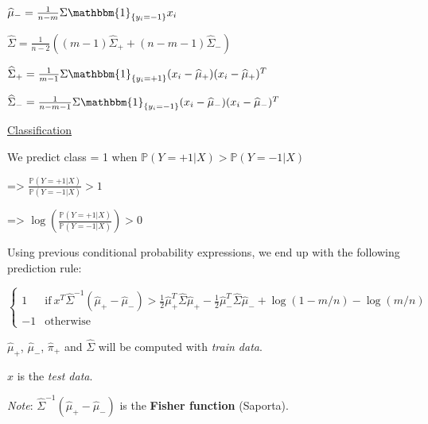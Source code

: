 $\widehat{\mu}_- = \frac{1}{n-m} \Sigma \mathbbm{1}_{\{y_i=-1\}}x_i$

$\widehat{\Sigma} = \frac{1}{n-2} ((m-1) \widehat{\Sigma}_+ + (n-m-1)\widehat{\Sigma}_-)$

$\widehat{\Sigma}_+ = \frac{1}{m-1} \Sigma \mathbbm{1}_{\{y_i=+1\}}(x_i-\widehat{\mu}_+)(x_i-\widehat{\mu}_+)^T$

$\widehat{\Sigma}_- = \frac{1}{n-m-1} \Sigma \mathbbm{1}_{\{y_i=-1\}}(x_i-\widehat{\mu}_-)(x_i-\widehat{\mu}_-)^T$

 \vspace{3mm}

\underline{Classification}

We predict class = 1 when $\mathbb{P}(Y=+1 | X) > \mathbb{P}(Y=-1 | X)$

=> $\frac{\mathbb{P}(Y=+1 | X)}{\mathbb{P}(Y=-1 | X)} > 1$

=> $\log(\frac{\mathbb{P}(Y=+1 | X)}{\mathbb{P}(Y=-1 | X)}) > 0$

Using previous conditional probability expressions, we end up with the following prediction rule:

  \begin{equation}
    \begin{cases}
      1 & \text{if}\ x^T\widehat{\Sigma}^{-1}(\widehat{\mu}_+ - \widehat{\mu}_-) > \frac{1}{2}\widehat{\mu}_+^T\widehat{\Sigma}\widehat{\mu}_+ - \frac{1}{2}\widehat{\mu}_-^T\widehat{\Sigma}\widehat{\mu}_- + \log(1-m/n) - \log(m/n) \\
      -1 & \text{otherwise}
    \end{cases}
  \end{equation}

$\widehat{\mu}_+$, $\widehat{\mu}_-$, $\widehat{\pi}_+$ and $\widehat{\Sigma}$ will be computed with \textit{train data}.

 $x$ is the \textit{test data}.

\vspace{3mm}

\textit{Note}: $\widehat{\Sigma}^{-1}(\widehat{\mu}_+ - \widehat{\mu}_-)$ is the \textbf{Fisher function} (Saporta).

